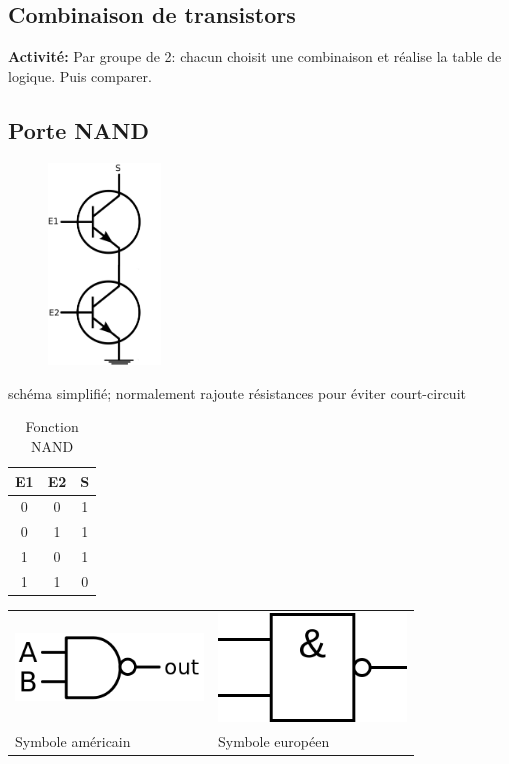 \documentclass[a4paper,11pt]{article}
\begin{document}
\begin{Form}
\setcounter{section}{2}
\section{Combinaison de transistors}
\begin{commentprof}
\textbf{Activité:} Par groupe de 2: chacun choisit une combinaison et réalise la table de logique. Puis comparer.
\end{commentprof}
\subsection{Porte NAND}
\begin{figure}[!h]
\centering
\includegraphics[width=3cm]{ressources/schema-nand.png}
\label{nand}
\end{figure}
\begin{commentprof}
schéma simplifié; normalement rajoute résistances pour éviter court-circuit
\end{commentprof}
\begin{table}[!h]
\begin{center}
\begin{tabular}{|c|c|c|}
\hline 
E1 & E2 & S \\ 
\hline 
0 & 0 & 1 \\ 
\hline 
0 & 1 & 1\\ 
\hline 
1 & 0 & 1\\
\hline 
1 & 1 & 0\\
\hline 
\end{tabular}
\caption{\label{not}Fonction NAND}
\end{center}
\end{table} 
\begin{center}
\begin{tabular}{*{2}{>{\centering\arraybackslash}m{}}}
\includegraphics[width=5cm]{ressources/not-and-us.png}
  & 
\includegraphics[width=5cm]{ressources/not-and-eu.png}  
   \\
Symbole américain & Symbole européen
\end{tabular}
\end{center}

\end{Form}
\end{document}
